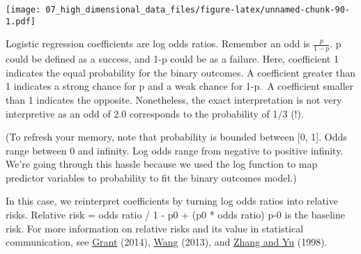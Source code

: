 \documentclass[
]{book}
\newenvironment{Shaded}{\begin{snugshade}}{\end{snugshade}}
\newcommand{\CommentTok}[1]{\textcolor[rgb]{0.56,0.35,0.01}{\textit{#1}}}
\newcommand{\ControlFlowTok}[1]{\textcolor[rgb]{0.13,0.29,0.53}{\textbf{#1}}}
\newcommand{\DecValTok}[1]{\textcolor[rgb]{0.00,0.00,0.81}{#1}}
\newcommand{\FunctionTok}[1]{\textcolor[rgb]{0.00,0.00,0.00}{#1}}
\newcommand{\NormalTok}[1]{#1}
\newcommand{\OtherTok}[1]{\textcolor[rgb]{0.56,0.35,0.01}{#1}}
\newcommand{\SpecialCharTok}[1]{\textcolor[rgb]{0.00,0.00,0.00}{#1}}
\newcommand{\StringTok}[1]{\textcolor[rgb]{0.31,0.60,0.02}{#1}}
\begin{document}
\texttt{[image: 07\_high\_dimensional\_data\_files/figure-latex/unnamed-chunk-90-1.pdf]}

Logistic regression coefficients are log odds ratios. Remember an odd is \(\frac{p}{1-p}\). p could be defined as a success, and 1-p could be as a failure. Here, coefficient 1 indicates the equal probability for the binary outcomes. A coefficient greater than 1 indicates a strong chance for p and a weak chance for 1-p.~A coefficient smaller than 1 indicates the opposite. Nonetheless, the exact interpretation is not very interpretive as an odd of 2.0 corresponds to the probability of 1/3 (!).

(To refresh your memory, note that probability is bounded between {[}0, 1{]}. Odds range between 0 and infinity. Log odds range from negative to positive infinity. We're going through this hassle because we used the log function to map predictor variables to probability to fit the binary outcomes model.)

In this case, we reinterpret coefficients by turning log odds ratios into relative risks. Relative risk = odds ratio / 1 - p0 + (p0 * odds ratio) p-0 is the baseline risk. For more information on relative risks and its value in statistical communication, see \href{https://www.bmj.com/content/348/bmj.f7450}{Grant} (2014), \href{https://www.jstatsoft.org/article/view/v055i05}{Wang} (2013), and \href{https://jamanetwork.com/journals/jama/fullarticle/188182}{Zhang and Yu} (1998).

\begin{Shaded}
\end{Shaded}
\end{document}
